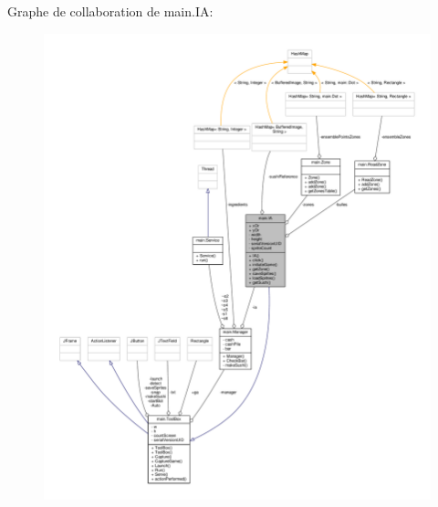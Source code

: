 Graphe de collaboration de main.\+I\+A\+:\nopagebreak
\begin{figure}[H]
\begin{center}
\leavevmode
\includegraphics[width=350pt]{classmain_1_1IA__coll__graph}
\end{center}
\end{figure}
